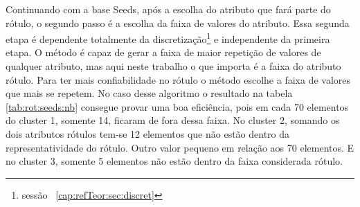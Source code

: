 Continuando com a base Seeds, após a escolha do atributo que fará parte do rótulo, o segundo passo é a escolha da faixa de valores do atributo. Essa segunda etapa é dependente totalmente da discretização\footnote{sessão ~\ref{cap:refTeor:sec:discret}} e independente da primeira etapa. O método é capaz de gerar a faixa de maior repetição de valores de qualquer atributo, mas aqui neste trabalho o que importa é a faixa do atributo rótulo. Para ter mais  confiabilidade  no rótulo o método escolhe a faixa de valores que mais se repetem. No caso desse algoritmo o resultado na tabela \ref{tab:rot:seeds:nb} consegue provar uma boa eficiência, pois em cada 70 elementos do cluster 1, somente 14, ficaram de fora dessa faixa. No cluster 2, somando os dois atributos rótulos tem-se 12 elementos que não estão dentro da representatividade do rótulo. Outro valor pequeno em relação aos 70 elementos. E no cluster 3, somente 5 elementos não estão dentro da faixa considerada rótulo.


